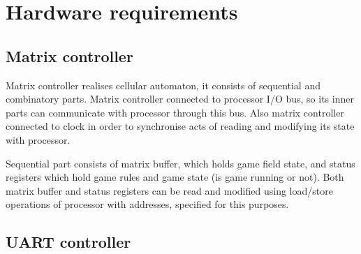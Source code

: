 \chapter*{Hardware requirements}

\section*{Matrix controller}

Matrix controller realises cellular automaton, it consists of sequential and combinatory parts. Matrix controller connected to processor I/O bus, so its inner parts can communicate with processor through this bus. Also matrix controller connected to clock in order to synchronise acts of reading and modifying its state with processor.

Sequential part consists of matrix buffer, which holds game field state, and status registers  which hold game rules and game state (is game running or not). Both matrix buffer and status registers can be read and modified using load/store operations of processor with addresses, specified for this purposes.

\section*{UART controller}
